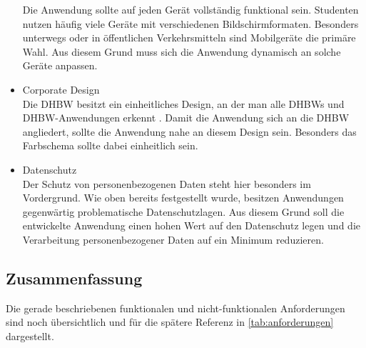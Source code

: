 \begin{itemize}
        Die Anwendung sollte auf jeden Gerät vollständig funktional sein.
        Studenten nutzen häufig viele Geräte mit verschiedenen Bildschirmformaten.
        Besonders unterwegs oder in öffentlichen Verkehrsmitteln sind Mobilgeräte die primäre Wahl.
        Aus diesem Grund muss sich die Anwendung dynamisch an solche Geräte anpassen.
    \item Corporate Design\\
        Die DHBW besitzt ein einheitliches Design, an der man alle DHBWs und DHBW-Anwendungen erkennt \autocite{CD-DHBW}.
        Damit die Anwendung sich an die DHBW angliedert, sollte die Anwendung nahe an diesem Design sein.
        Besonders das Farbschema sollte dabei einheitlich sein. %
    \item Datenschutz\\
        Der Schutz von personenbezogenen Daten steht hier besonders im Vordergrund.
        Wie oben bereits festgestellt wurde, besitzen Anwendungen gegenwärtig problematische Datenschutzlagen.
        Aus diesem Grund soll die entwickelte Anwendung einen hohen Wert auf den Datenschutz legen und die Verarbeitung personenbezogener Daten auf ein Minimum reduzieren.
\end{itemize}



\subsection{Zusammenfassung}
Die gerade beschriebenen funktionalen und nicht-funktionalen Anforderungen sind noch übersichtlich und für die spätere Referenz in \autoref{tab:anforderungen} dargestellt.


